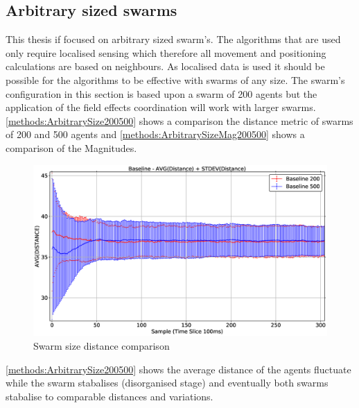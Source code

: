 \subsection{Arbitrary sized swarms}\label{section:arbitrary}
This thesis if focused on arbitrary sized swarm's. The algorithms that are used only require localised sensing which therefore all movement and positioning calculations are based on neighbours. As localised data is used it should be possible for the algorithms to be effective with swarms of any size. The swarm's configuration in this section is based upon a swarm of 200 agents but the application of the field effects coordination will work with larger swarms. \autoref{methods:ArbitrarySize200500} shows a comparison the distance metric of swarms of 200 and 500 agents and \autoref{methods:ArbitrarySizeMag200500} shows a comparison of the Magnitudes.

\begin{figure}[H]
\begin{center}
\includegraphics[width=13cm]{CHAPTER-5/figures/ArbitrarySize200500}
\end{center}
\caption{Swarm size distance comparison\label{methods:ArbitrarySize200500}}
\end{figure}

\autoref{methods:ArbitrarySize200500} shows the average distance of the agents fluctuate while the swarm stabalises (disorganised stage) and eventually both swarms stabalise to comparable distances and variations. 

